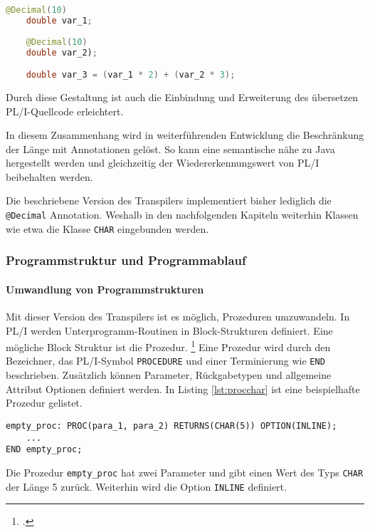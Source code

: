 \begin{lstlisting}[language=Java, caption=Annotations Lösung des DECIMAL-Typs, label={lst:annotationdecimal}]
	@Decimal(10)
	double var_1;
	
	@Decimal(10)
	double var_2);

	double var_3 = (var_1 * 2) + (var_2 * 3);
\end{lstlisting}

Durch diese Gestaltung ist auch die Einbindung und Erweiterung des übersetzen PL/I-Quellcode erleichtert.

In diesem Zusammenhang wird in weiterführenden Entwicklung die Beschränkung der Länge mit Annotationen gelöst. So kann eine semantische nähe zu Java hergestellt werden und gleichzeitig der Wiedererkennungswert von PL/I beibehalten werden.

Die beschriebene Version des Transpilers implementiert bisher lediglich die \verb+@Decimal+ Annotation.
Weshalb in den nachfolgenden Kapiteln weiterhin Klassen wie etwa die Klasse \verb+CHAR+ eingebunden werden.

\pagebreak
\subsubsection{Programmstruktur und Programmablauf}
\paragraph{Umwandlung von Programmstrukturen }\label{programstruct}

Mit dieser Version des Transpilers ist es möglich, Prozeduren umzuwandeln.
In PL/I werden Unterprogramm-Routinen in Block-Strukturen definiert. Eine mögliche Block Struktur ist die Prozedur. \footcite[Vgl. ][S. 97ff. ]{pliref}
Eine Prozedur wird durch den Bezeichner, das PL/I-Symbol \verb+PROCEDURE+ und einer Terminierung wie \verb+END+ beschrieben.
Zusätzlich können Parameter, Rückgabetypen und allgemeine Attribut Optionen definiert werden. In Listing \ref{lst:procchar} ist eine beispielhafte Prozedur gelistet.

\begin{lstlisting}[language=PL/I, caption=Deklaration einer Prozedur des Typs Char, label={lst:procchar}]
empty_proc: PROC(para_1, para_2) RETURNS(CHAR(5)) OPTION(INLINE);
	...
END empty_proc;
\end{lstlisting}

Die Prozedur \verb+empty_proc+ hat zwei Parameter und gibt einen Wert des Typs \verb+CHAR+ der L\"ange 5 zur\"uck.
Weiterhin wird die Option \verb+INLINE+ definiert.

